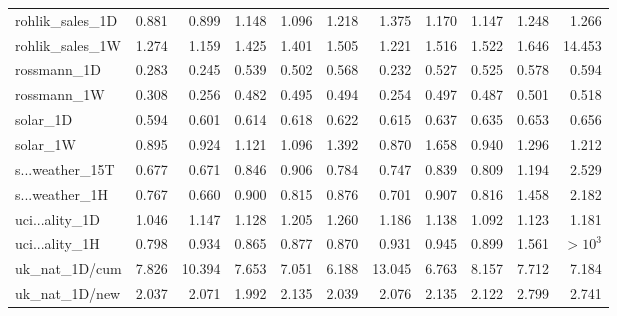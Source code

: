 {\begin{longtable}{@{}p{2.2cm}@{\hspace{6pt}}rrrrrrrrrr@{}}
\ttfamily\scriptsize rohlik\_sales\_1D & \cellcolor{medalGold}0.881 & \cellcolor{medalSilver}0.899 & 1.148 & \cellcolor{medalBronze}1.096 & 1.218 & 1.375 & 1.170 & 1.147 & 1.248 & 1.266 \\
\ttfamily\scriptsize rohlik\_sales\_1W & \cellcolor{medalBronze}1.274 & \cellcolor{medalGold}1.159 & 1.425 & 1.401 & 1.505 & \cellcolor{medalSilver}1.221 & 1.516 & 1.522 & 1.646 & 14.453 \\
\ttfamily\scriptsize rossmann\_1D & \cellcolor{medalBronze}0.283 & \cellcolor{medalSilver}0.245 & 0.539 & 0.502 & 0.568 & \cellcolor{medalGold}0.232 & 0.527 & 0.525 & 0.578 & 0.594 \\
\ttfamily\scriptsize rossmann\_1W & \cellcolor{medalBronze}0.308 & \cellcolor{medalSilver}0.256 & 0.482 & 0.495 & 0.494 & \cellcolor{medalGold}0.254 & 0.497 & 0.487 & 0.501 & 0.518 \\
\ttfamily\scriptsize solar\_1D & \cellcolor{medalGold}0.594 & \cellcolor{medalSilver}0.601 & \cellcolor{medalBronze}0.614 & 0.618 & 0.622 & 0.615 & 0.637 & 0.635 & 0.653 & 0.656 \\
\ttfamily\scriptsize solar\_1W & \cellcolor{medalSilver}0.895 & \cellcolor{medalBronze}0.924 & 1.121 & 1.096 & 1.392 & \cellcolor{medalGold}0.870 & 1.658 & 0.940 & 1.296 & 1.212 \\
\ttfamily\scriptsize s...weather\_15T & \cellcolor{medalSilver}0.677 & \cellcolor{medalGold}0.671 & 0.846 & 0.906 & 0.784 & \cellcolor{medalBronze}0.747 & 0.839 & 0.809 & 1.194 & 2.529 \\
\ttfamily\scriptsize s...weather\_1H & \cellcolor{medalBronze}0.767 & \cellcolor{medalGold}0.660 & 0.900 & 0.815 & 0.876 & \cellcolor{medalSilver}0.701 & 0.907 & 0.816 & 1.458 & 2.182 \\
\ttfamily\scriptsize uci...ality\_1D & \cellcolor{medalGold}1.046 & 1.147 & 1.128 & 1.205 & 1.260 & 1.186 & 1.138 & \cellcolor{medalSilver}1.092 & \cellcolor{medalBronze}1.123 & 1.181 \\
\ttfamily\scriptsize uci...ality\_1H & \cellcolor{medalGold}0.798 & 0.934 & \cellcolor{medalSilver}0.865 & 0.877 & \cellcolor{medalBronze}0.870 & 0.931 & 0.945 & 0.899 & 1.561 & $>\!10^{3}$ \\
\ttfamily\scriptsize uk\_nat\_1D/cum & 7.826 & 10.394 & 7.653 & \cellcolor{medalBronze}7.051 & \cellcolor{medalGold}6.188 & 13.045 & \cellcolor{medalSilver}6.763 & 8.157 & 7.712 & 7.184 \\
\ttfamily\scriptsize uk\_nat\_1D/new & \cellcolor{medalSilver}2.037 & 2.071 & \cellcolor{medalGold}1.992 & 2.135 & \cellcolor{medalBronze}2.039 & 2.076 & 2.135 & 2.122 & 2.799 & 2.741 \\

\end{longtable}}
